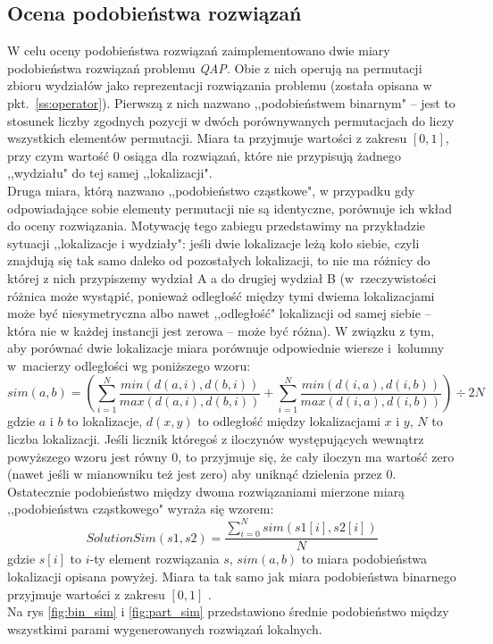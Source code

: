 \documentclass{article}
\begin{document}
	\subsection{Ocena podobieństwa rozwiązań}
		W celu oceny podobieństwa rozwiązań zaimplementowano dwie miary podobieństwa rozwiązań problemu \emph{QAP}. Obie z nich operują na permutacji zbioru wydziałów jako reprezentacji rozwiązania problemu (została opisana w pkt.~\ref{ss:operator}). Pierwszą z nich nazwano ,,podobieństwem binarnym" -- jest to stosunek liczby zgodnych pozycji w dwóch porównywanych permutacjach do liczy wszystkich elementów permutacji. Miara ta przyjmuje wartości z zakresu $[0,1]$, przy czym wartość 0 osiąga dla rozwiązań, które nie przypisują żadnego ,,wydziału" do tej samej ,,lokalizacji".
	\\Druga miara, którą nazwano ,,podobieństwo cząstkowe", w przypadku gdy odpowiadające sobie elementy permutacji nie są identyczne, porównuje ich wkład do oceny rozwiązania. Motywację tego zabiegu przedstawimy na przykładzie sytuacji ,,lokalizacje i wydziały": jeśli dwie lokalizacje leżą koło siebie, czyli znajdują się tak samo daleko od pozostałych lokalizacji, to nie ma różnicy do której z nich przypiszemy wydział A a do drugiej wydział B (w~rzeczywistości różnica może wystąpić, ponieważ odległość między tymi dwiema lokalizacjami może być niesymetryczna albo nawet ,,odległość" lokalizacji od samej siebie -- która nie w każdej instancji jest zerowa -- może być różna). W związku z tym, aby porównać dwie lokalizacje miara porównuje odpowiednie wiersze i~kolumny w~macierzy odległości wg poniższego wzoru:
		$$ sim(a, b) = \left(\sum_{i=1}^{N}\frac{min(d(a,i), d(b,i))}{max(d(a,i), d(b,i))} +  \sum_{i=1}^{N}\frac{min(d(i,a), d(i,b))}{max(d(i,a), d(i,b))}\right) \div 2N  $$
		gdzie $a$ i $b$ to lokalizacje, $d(x,y)$ to odległość między lokalizacjami $x$ i $y$, $N$ to liczba lokalizacji. Jeśli licznik któregoś z iloczynów występujących wewnątrz powyższego wzoru jest równy 0, to przyjmuje się, że cały iloczyn ma wartość zero (nawet jeśli w mianowniku też jest zero) aby uniknąć dzielenia przez 0.
\\Ostatecznie podobieństwo między dwoma rozwiązaniami mierzone miarą ,,podobieństwa cząstkowego" wyraża się wzorem:
$$ SolutionSim(s1, s2) = \frac{\sum_{i=0}^{N}{sim(s1[i], s2[i])}}{N}$$	
		gdzie $s[i]$ to $i$-ty element rozwiązania $s$, $sim(a,b)$ to miara podobieństwa lokalizacji opisana powyżej.
		Miara ta tak samo jak miara podobieństwa binarnego przyjmuje wartości z zakresu $ [0,1] $ .
	\\Na rys \ref{fig:bin_sim} i \ref{fig:part_sim} przedstawiono średnie podobieństwo między wszystkimi parami wygenerowanych rozwiązań lokalnych. 
\end{document}
